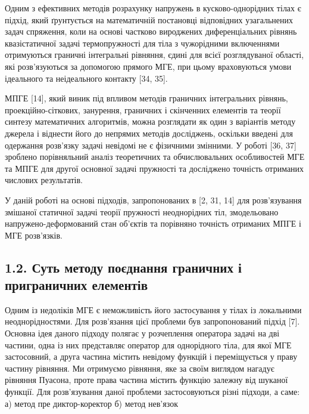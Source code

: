 Одним з ефективних методів розрахунку напружень в кусково-однорідних
тілах є підхід, який ґрунтується на математичній постановці відповідних
узагальнених задач спряження, коли на основі частково вироджених
диференціальних рівнянь квазістатичної задачі термопружності для тіла з
чужорідними включеннями отримуються граничні інтегральні рівняння, єдині
для всієї розглядуваної області, які розв'язуються за допомогою прямого
МГЕ, при цьому враховуються умови ідеального та неідеального контакту
{[}34, 35{]}.

МПГЕ {[}14{]}, який виник під впливом методів граничних інтегральних
рівнянь, проекційно-сіткових, занурення, граничних і скінченних
елементів та теорії синтезу математичних алгоритмів, можна розглядати як
один з варіантів методу джерела і віднести його до непрямих методів
досліджень, оскільки введені для одержання розв'язку задачі невідомі не
є фізичними змінними. У роботі {[}36, 37{]} зроблено порівняльний аналіз
теоретичних та обчислювальних особливостей МГЕ та МПГЕ для другої
основної задачі пружності та досліджено точність отриманих числових
результатів.

У даній роботі на основі підходів, запропонованих в {[}2, 31, 14{]} для
розв'язу­вання змішаної статичної задачі теорії пружності неоднорідних
тіл, змодельовано напружено-деформований стан об'єктів та порів­няно
точ­ність отриманих МПГЕ і МГЕ розв'язків.

\hypertarget{ux441ux443ux442ux44c-ux43cux435ux442ux43eux434ux443-ux43fux43eux454ux434ux43dux430ux43dux43dux44f-ux433ux440ux430ux43dux438ux447ux43dux438ux445-ux456-ux43fux440ux438ux433ux440ux430ux43dux438ux447ux43dux438ux445-ux435ux43bux435ux43cux435ux43dux442ux456ux432}{%
\subsection{1.2. Суть методу поєднання граничних і приграничних
елементів}\label{ux441ux443ux442ux44c-ux43cux435ux442ux43eux434ux443-ux43fux43eux454ux434ux43dux430ux43dux43dux44f-ux433ux440ux430ux43dux438ux447ux43dux438ux445-ux456-ux43fux440ux438ux433ux440ux430ux43dux438ux447ux43dux438ux445-ux435ux43bux435ux43cux435ux43dux442ux456ux432}}

Одним із недоліків МГЕ є неможливість його застосування у тілах із
локальними неоднорідностями. Для розв'язання цієї проблеми був
запропонований підхід {[}7{]}. Основна ідея даного підходу полягає у
розчеплення оператора задачі на дві частини, одна із них представляє
оператор для однорідного тіла, для якої МГЕ застосовний, а друга частина
містить невідому функцій і переміщується у праву частину рівняння. Ми
отримуємо рівняння, яке за своїм виглядом нагадує рівняння Пуасона,
проте права частина містить функцію залежну від шуканої функції. Для
розв'язування даної проблеми застосовуються різні підходи, а саме: а)
метод пре диктор-коректор б) метод нев'язок

